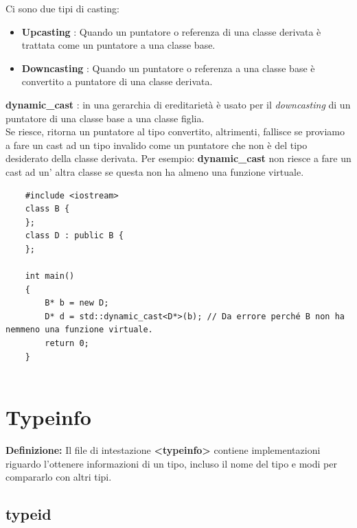\textsf{\small Ci sono due tipi di casting: } \\

\begin{itemize}
	\item \textsf{\small \textbf{Upcasting} : Quando un puntatore o referenza di una classe derivata è trattata come un puntatore a una classe base.}
	\item \textsf{\small \textbf{Downcasting} : Quando un puntatore o referenza a una classe base è convertito a puntatore di una classe derivata.}
\end{itemize}

\textsf{\small \textbf{dynamic\_cast} : in una gerarchia di ereditarietà è usato per il \emph{downcasting} di un puntatore di una classe base a una classe figlia.} \\

\textsf{\small Se riesce, ritorna un puntatore al tipo convertito, altrimenti, fallisce se proviamo a fare un cast ad un tipo invalido come un puntatore che non è del tipo desiderato della classe derivata. Per esempio: \textbf{dynamic\_cast} non riesce a fare un cast ad un' altra classe se questa non ha almeno una funzione virtuale.} \\

\begin{lstlisting}
	#include <iostream>
	class B {
	};
	class D : public B {
	};
	
	int main()
	{
		B* b = new D;
		D* d = std::dynamic_cast<D*>(b); // Da errore perché B non ha nemmeno una funzione virtuale.
		return 0;
	}
	
\end{lstlisting}


\section{Typeinfo}

\textsf{\small \textbf{Definizione: } Il file di intestazione \textbf{<typeinfo>} contiene implementazioni riguardo l'ottenere informazioni di un tipo, incluso il nome del tipo e modi per compararlo con altri tipi.} \\

\subsection{typeid}

